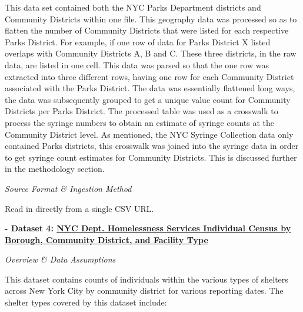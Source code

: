 \documentclass[
]{article}
\begin{document}
This data set contained both the NYC Parks Department districts and
Community Districts within one file. This geography data was processed
so as to flatten the number of Community Districts that were listed for
each respective Parks District. For example, if one row of data for
Parks District X listed overlaps with Community Districts A, B and C.
These three districts, in the raw data, are listed in one cell. This
data was parsed so that the one row was extracted into three different
rows, having one row for each Community District associated with the
Parks District. The data was essentially flattened long ways, the data
was subsequently grouped to get a unique value count for Community
Districts per Parks District. The processed table was used as a
crosswalk to process the syringe numbers to obtain an estimate of
syringe counts at the Community District level. As mentioned, the NYC
Syringe Collection data only contained Parks districts, this crosswalk
was joined into the syringe data in order to get syringe count estimates
for Community Districts. This is discussed further in the methodology
section.

\emph{Source Format \& Ingestion Method}

Read in directly from a single CSV URL.

\textbf{- Dataset 4:
\href{https://data.cityofnewyork.us/Social-Services/Individual-Census-by-Borough-Community-District-an/veav-vj3r/about_data}{NYC
Dept. Homelessness Services Individual Census by Borough, Community
District, and Facility Type}}

\emph{Overview \& Data Assumptions}

This dataset contains counts of individuals within the various types of
shelters across New York City by community district for various
reporting dates. The shelter types covered by this dataset include:
\end{document}
